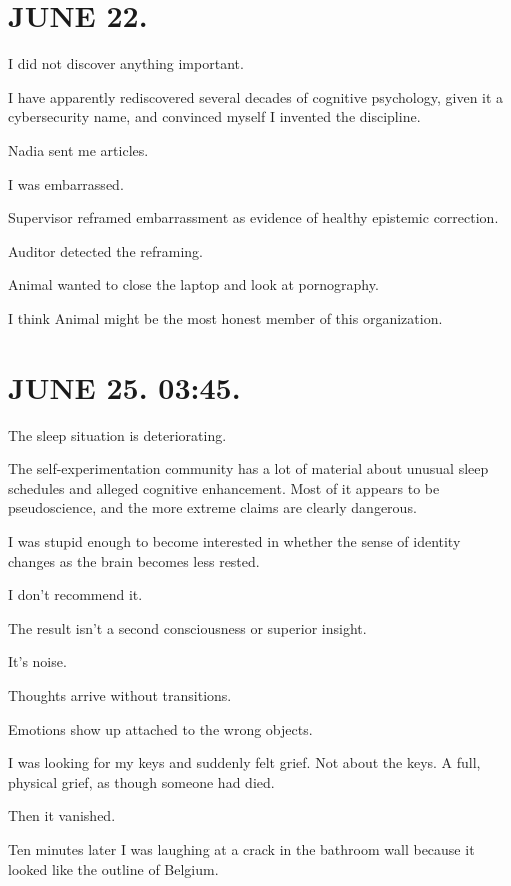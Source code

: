 \documentclass[11pt,oneside]{book}
\begin{document}
\section*{JUNE 22.}

I did not discover anything important.

I have apparently rediscovered several decades of cognitive psychology, given it a cybersecurity name, and convinced myself I invented the discipline.

Nadia sent me articles.

I was embarrassed.

Supervisor reframed embarrassment as evidence of healthy epistemic correction.

Auditor detected the reframing.

Animal wanted to close the laptop and look at pornography.

I think Animal might be the most honest member of this organization.

\section*{JUNE 25. 03:45.}

The sleep situation is deteriorating.

The self-experimentation community has a lot of material about unusual sleep schedules and alleged cognitive enhancement. Most of it appears to be pseudoscience, and the more extreme claims are clearly dangerous.

I was stupid enough to become interested in whether the sense of identity changes as the brain becomes less rested.

I don't recommend it.

The result isn't a second consciousness or superior insight.

It's noise.

Thoughts arrive without transitions.

Emotions show up attached to the wrong objects.

I was looking for my keys and suddenly felt grief. Not about the keys. A full, physical grief, as though someone had died.

Then it vanished.

Ten minutes later I was laughing at a crack in the bathroom wall because it looked like the outline of Belgium.
\end{document}
